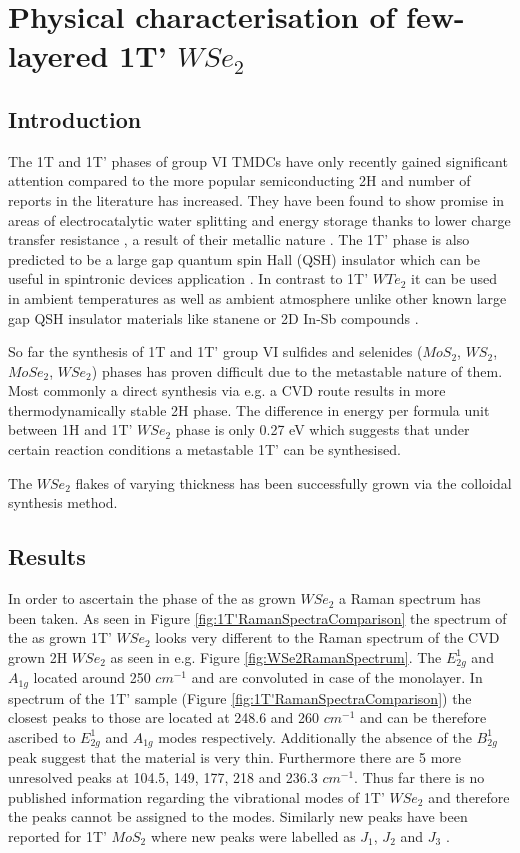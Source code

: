 \chapter{Physical characterisation of few-layered 1T' $WSe_2$}

\section{Introduction}

The 1T and 1T' phases of group VI TMDCs have only recently gained significant attention compared to the more popular semiconducting 2H and number of reports in the literature has increased. They have been found to show promise in areas of electrocatalytic water splitting and energy storage thanks to lower charge transfer resistance \cite{Voiry2013}, a result of their metallic nature \cite{Wypych1992}. The 1T' phase is also predicted to be a large gap quantum spin Hall (QSH) insulator which can be useful in spintronic devices  application \cite{Chen2018}. In contrast to 1T' $WTe_2$ \cite{Fei2017} it can be used in ambient temperatures as well as ambient atmosphere unlike other known large gap QSH insulator materials like stanene \cite{Xu2013} or 2D In-Sb compounds \cite{Gruznev2018}. 

So far the synthesis of 1T and 1T' group VI sulfides and selenides ($MoS_2$, $WS_2$, $MoSe_2$, $WSe_2$)  phases has proven difficult due to the metastable nature of them. Most commonly a direct synthesis via e.g. a CVD route results in more thermodynamically stable 2H phase. The difference in energy per formula unit between 1H and 1T' $WSe_2$ phase is only 0.27 eV which suggests that under certain reaction conditions a metastable 1T' can be synthesised.

The $WSe_2$ flakes of varying thickness has been successfully grown via the colloidal synthesis method. 

\section{Results}

In order to ascertain the phase of the as grown $WSe_2$ a Raman spectrum has been taken. As seen in Figure \ref{fig:1T'RamanSpectraComparison} the spectrum of the as grown 1T' $WSe_2$ looks very different to the Raman spectrum of the CVD grown 2H $WSe_2$ as seen in e.g. Figure \ref{fig:WSe2RamanSpectrum}. The $E^1_{2g}$ and $A_{1g}$ located around 250 $cm^{-1}$ and are convoluted in case of the monolayer. In spectrum of the 1T' sample (Figure \ref{fig:1T'RamanSpectraComparison}) the closest peaks to those are located at 248.6 and 260 $cm^{-1}$ and can be therefore ascribed to $E^1_{2g}$ and $A_{1g}$ modes respectively. Additionally the absence of the $B^1_{2g}$ peak suggest that the material is very thin. Furthermore there are 5 more unresolved peaks at 104.5, 149, 177, 218 and 236.3 $cm^{-1}$. Thus far there is no published information regarding the vibrational modes of 1T' $WSe_2$ and therefore the peaks cannot be assigned to the modes. Similarly new peaks have been reported for 1T' $MoS_2$ where new peaks were labelled as $J_1$, $J_2$ and $J_3$ \cite{Yu2018}.

